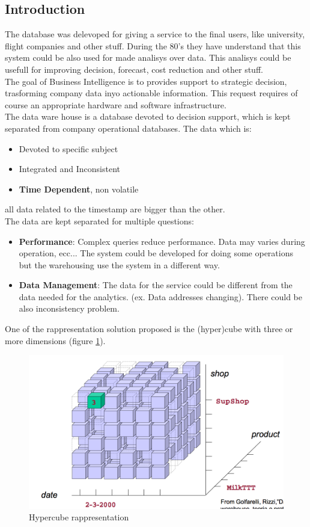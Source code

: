 \documentclass[12pt]{article}
\begin{document}
\subsection{Introduction}
The database was delevoped for giving a service to the final users, like university, flight companies and other stuff. During the 80's they have understand that this system could be also used for made analisys over data. This analisys could be usefull for improving decision, forecast, cost reduction and other stuff.\\
The goal of Business Intelligence is to provides support to strategic decision, trasforming company data inyo actionable information. This request requires of course an appropriate hardware and software infrastructure.\\
The data ware house is a database devoted to decision support, which is kept separated from company operational databases. The data which is:
\begin{itemize}
  \item Devoted to specific subject
  \item Integrated and Inconsistent
  \item \textbf{Time Dependent}, non volatile
\end{itemize}
all data related to the timestamp are bigger than the other.\\
The data are kept separated for multiple questions:
\begin{itemize}
  \item \textbf{Performance}: Complex queries reduce performance. Data may varies during operation, ecc... The system could be developed for doing some operations but the warehousing use the system in a different way.
  \item \textbf{Data Management}: The data for the service could be different from the data needed for the analytics. (ex. Data addresses changing). There could be also inconsistency problem.
\end{itemize}
One of the rappresentation solution proposed is the (hyper)cube with three or more dimensions (figure \ref{fig:hypercube}).
\begin{figure}[h!]
  \includegraphics[width=\linewidth]{images/hypercube.png}
  \caption{Hypercube rappresentation}
  \label{fig:hypercube}
\end{figure}
\end{document}
